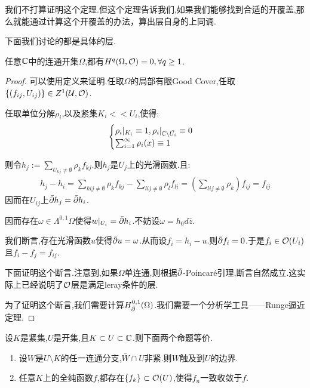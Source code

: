 我们不打算证明这个定理.但这个定理告诉我们,如果我们能够找到合适的开覆盖,那么就能通过计算这个开覆盖的办法，算出层自身的上同调.

下面我们讨论的都是具体的层.
\begin{lemma}
	任意$\mathbb{C}$中的连通开集$\Omega$,都有$H^q(\Omega,\mathcal{O})=0,\forall q\geq 1$.
\end{lemma}
\begin{proof}
	可以使用定义来证明.任取$\Omega$的局部有限Good Cover,任取$\{(f_{ij},U_{ij})\} \in Z^1(\mathcal{U},\mathcal{O})$.

	任取单位分解$\rho_i$,以及紧集$K_i <<U_i$,使得:
	\begin{align*}
		\begin{cases}
			\rho_i|_{K_i}\equiv 1,\rho_i|_{\mathbb{C}\setminus \bar{U_i}}\equiv 0  \\
			\sum_{i=1}^\infty \rho_i(x)\equiv 1
		\end{cases}
	\end{align*}

	则令$h_j:=\sum_{U_{kj}\neq \emptyset}\rho_kf_{kj}$.则$h_j$是$U_j$上的光滑函数.且:
	\begin{align*}
		h_j-h_i=\sum_{kij\neq \emptyset}\rho_{k}f_{kj}-\sum_{lij\neq \emptyset}\rho_l f_{li}=(\sum_{lij\neq \emptyset}\rho_k)f_{ij}=f_{ij}
	\end{align*}
	因而在$U_{ij}$上$\bar{\partial} h_j=\bar{\partial} h_i$.
	
	因而存在$\omega \in \Lambda^{0,1} \Omega$使得$w|_{U_i}=\bar{\partial} h_i$.不妨设$\omega=h_0 d\bar{z}$.

	我们断言,存在光滑函数$u$使得$\bar{\partial} u=\omega$.从而设$f_i=h_i-u$.则$\bar{\partial}{f_i}=0$.于是$f_i \in \mathcal{O}(U_i)$且$f_i-f_j=f_{ij}$.

	下面证明这个断言.注意到,如果$\Omega$单连通,则根据$\bar{\partial}$-Poincar\'{e}引理,断言自然成立.这实际上已经说明了$\mathcal{O}$层是满足leray条件的层.

	为了证明这个断言,我们需要计算$H^{0,1}_{\bar{\partial}}(\Omega)$.我们需要一个分析学工具——Runge逼近定理.
\end{proof}
\begin{lemma}[Runge逼近定理]
	设$K$是紧集,$U$是开集,且$K \subset U \subset \mathbb{C}$.则下面两个命题等价.
	\begin{enumerate}[(1)]
		\item 设$W$是$U \setminus K$的任一连通分支,$\bar{W}\cap U$非紧.则$W$触及到$U$的边界.
		\item 任意$K$上的全纯函数$f$,都存在$\{f_k\} \subset \mathcal{O}(U)$,使得$f_n$一致收敛于$f$.
	\end{enumerate}
\end{lemma}

